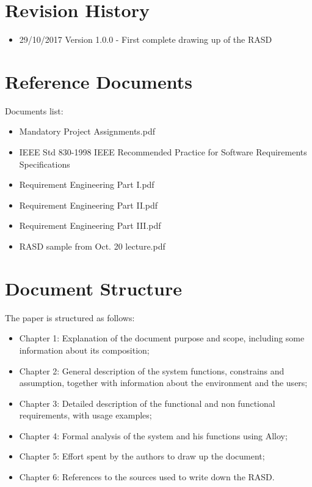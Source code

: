 \section{Revision History}
\begin{itemize}
\item 29/10/2017 Version 1.0.0 - First complete drawing up of the RASD
\end{itemize}
%
%
\section{Reference Documents}
Documents list:
\begin{itemize}
\item Mandatory Project Assignments.pdf
\item IEEE Std 830-1998 IEEE Recommended Practice for Software Requirements
Specifications
\item Requirement Engineering Part I.pdf
\item Requirement Engineering Part II.pdf
\item Requirement Engineering Part III.pdf
\item RASD sample from Oct. 20 lecture.pdf
\end{itemize}
%
%
\section{Document Structure}
The paper is structured as follows:
\begin{itemize}
\item Chapter 1: Explanation of the document purpose and scope, including some information about its composition;
\item Chapter 2: General description of the system functions, constrains and assumption, together with information about the environment and the users;
\item Chapter 3: Detailed description of the functional and non functional requirements, with usage examples;
\item Chapter 4: Formal analysis of the system and his functions using Alloy;
\item Chapter 5: Effort spent by the authors to draw up the document;
\item Chapter 6: References to the sources used to write down the RASD.
\end{itemize}
%
%
